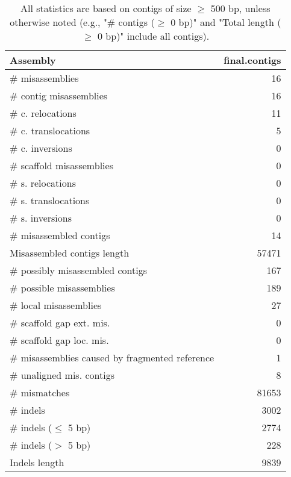 \documentclass[12pt,a4paper]{article}
\begin{document}
\begin{table}[ht]
\begin{center}
\caption{All statistics are based on contigs of size $\geq$ 500 bp, unless otherwise noted (e.g., "\# contigs ($\geq$ 0 bp)" and "Total length ($\geq$ 0 bp)" include all contigs).}
\begin{tabular}{|l*{1}{|r}|}
\hline
Assembly & final.contigs \\ \hline
\# misassemblies & 16 \\ \hline
\hspace{2mm}\# contig misassemblies & 16 \\ \hline
\hspace{5mm}\# c. relocations & 11 \\ \hline
\hspace{5mm}\# c. translocations & 5 \\ \hline
\hspace{5mm}\# c. inversions & 0 \\ \hline
\hspace{2mm}\# scaffold misassemblies & 0 \\ \hline
\hspace{5mm}\# s. relocations & 0 \\ \hline
\hspace{5mm}\# s. translocations & 0 \\ \hline
\hspace{5mm}\# s. inversions & 0 \\ \hline
\# misassembled contigs & 14 \\ \hline
Misassembled contigs length & 57471 \\ \hline
\# possibly misassembled contigs & 167 \\ \hline
\hspace{5mm}\# possible misassemblies & 189 \\ \hline
\# local misassemblies & 27 \\ \hline
\# scaffold gap ext. mis. & 0 \\ \hline
\# scaffold gap loc. mis. & 0 \\ \hline
\# misassemblies caused by fragmented reference & 1 \\ \hline
\# unaligned mis. contigs & 8 \\ \hline
\# mismatches & 81653 \\ \hline
\# indels & 3002 \\ \hline
\hspace{5mm}\# indels ($\leq$ 5 bp) & 2774 \\ \hline
\hspace{5mm}\# indels ($>$ 5 bp) & 228 \\ \hline
Indels length & 9839 \\ \hline
\end{tabular}
\end{center}
\end{table}
\end{document}
